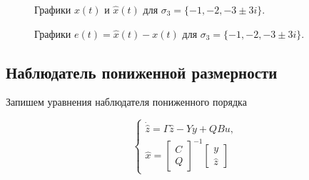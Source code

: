 \begin{figure}[!h]
\caption{Графики $x(t)$ и $\hat{x}(t)$ для $ \sigma_3 = \{ -1, -2, -3 \pm 3i \}$.}
\label{3_xx_nlin_02_L4}
\end{figure}


\begin{figure}[!h]
\caption{Графики $e (t) =\hat{x}(t) - x(t)$ для $ \sigma_3 = \{ -1, -2, -3 \pm 3i \}$.}
\label{3_e_nlin_02_L4}
\end{figure}


\newpage
\subsection{Наблюдатель пониженной размерности}
Запишем уравнения наблюдателя пониженного порядка

\begin{equation}
    \begin{cases}
        \dot{\hat{z}} = \Gamma \hat{z} - Yy+QBu,\\
        \hat{x} = \begin{bmatrix}
            C\\Q
        \end{bmatrix}^{-1} \begin{bmatrix}
            y\\
            \hat{z}
        \end{bmatrix}
    \end{cases}
\end{equation}

